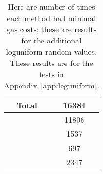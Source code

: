 \begin{table}[p]
\centering
\begin{tabular}{|c|S[table-format=5.0]|}
\hline
Total & 16384 \\
\hline
{} \UnrolledThree{} &  11806 \\
\WhileOne{}      &  1537 \\
\WhileTwo{}      &   697 \\
\WhileThree{}    &  2347 \\
\hline
\end{tabular}
\caption[Minimal Gas Costs Statistics]{Here are number of times
    each method had minimal gas costs;
    these are results for the additional loguniform random values.
    These results are for the tests in Appendix~\ref{app:loguniform}.
    }
\label{table:minimal_gas_costs_er}
\end{table}
